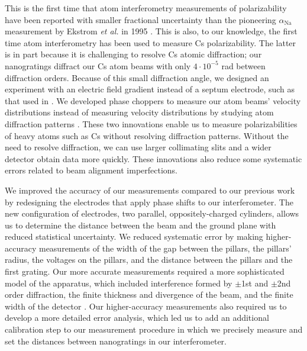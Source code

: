 \documentclass[twocolumn,prl,showpacs,superscriptaddress]{revtex4-1}   %
\newcommand{\etalspace}{\textit{et al. }}
\begin{document}
This is the first time that atom interferometry measurements of polarizability have been reported with smaller fractional uncertainty than the pioneering $\alpha_{\mathrm{Na}}$ measurement by Ekstrom \etalspace in 1995 \cite{Ekstrom1995}.
This is also, to our knowledge, the first time atom interferometry has been used to measure Cs polarizability.
The latter is in part because it is challenging to resolve Cs atomic diffraction; our nanogratings diffract our Cs atom beams with only $4\cdot 10^{-5}$ rad between diffraction orders. 
Because of this small diffraction angle, we designed an experiment 
with an electric field gradient instead of a septum electrode, such as that used in \cite{Ekstrom1995}.
We developed phase choppers \cite{Roberts2002,Roberts2004,Holmgren2011,Hromada2014} to measure our atom beams' velocity distributions instead of measuring velocity distributions by studying atom diffraction patterns \cite{Ekstrom1995,Holmgren2010}.
These two innovations enable us to measure polarizabilities of heavy atoms such as Cs without resolving diffraction patterns. 
Without the need to resolve diffraction, we can use larger collimating slits and a wider detector obtain data more quickly. These innovations also reduce some systematic errors related to beam alignment imperfections.

We improved the accuracy of our measurements compared to our previous work \cite{Holmgren2010} by redesigning the electrodes that apply phase shifts to our interferometer. 
The new configuration of electrodes, two parallel, oppositely-charged cylinders, allows us to determine the distance between the beam and the ground plane with reduced statistical uncertainty. We reduced systematic error by making higher-accuracy measurements of the width of the gap between the pillars, the pillars' radius, the voltages on the pillars, and the distance between the pillars and the first grating.
Our more accurate measurements required a more sophisticated model of the apparatus, which included
interference formed by $\pm$1st and $\pm$2nd order diffraction, the finite thickness and divergence of the beam, and the finite width of the detector \cite{Hromada2014}.
Our higher-accuracy measurements also required us to develop a more detailed error analysis, which led us to add an additional calibration step to our measurement procedure in which we precisely measure and set the distances between nanogratings in our interferometer.


\end{document}

